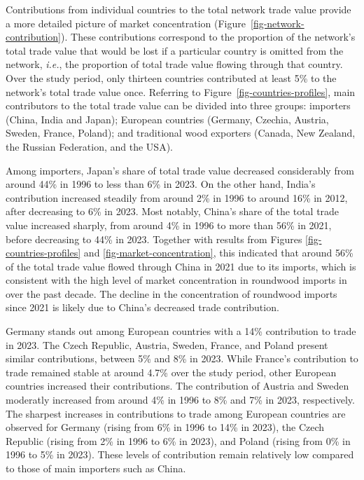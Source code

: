 \documentclass[
  authoryear,
  review,
  3p]{elsarticle}
\begin{document}
Contributions from individual countries to the total network trade value
provide a more detailed picture of market concentration
(Figure~\ref{fig-network-contribution}). These contributions correspond
to the proportion of the network's total trade value that would be lost
if a particular country is omitted from the network, \emph{i.e.}, the
proportion of total trade value flowing through that country. Over the
study period, only thirteen countries contributed at least 5\% to the
network's total trade value once. Referring to
Figure~\ref{fig-countries-profiles}, main contributors to the total
trade value can be divided into three groups: importers (China, India
and Japan); European countries (Germany, Czechia, Austria, Sweden,
France, Poland); and traditional wood exporters (Canada, New Zealand,
the Russian Federation, and the USA).

Among importers, Japan's share of total trade value decreased
considerably from around 44\% in 1996 to less than 6\% in 2023. On the
other hand, India's contribution increased steadily from around 2\% in
1996 to around 16\% in 2012, after decreasing to 6\% in 2023. Most
notably, China's share of the total trade value increased sharply, from
around 4\% in 1996 to more than 56\% in 2021, before decreasing to 44\%
in 2023. Together with results from Figures \ref{fig-countries-profiles}
and \ref{fig-market-concentration}, this indicated that around 56\% of
the total trade value flowed through China in 2021 due to its imports,
which is consistent with the high level of market concentration in
roundwood imports in over the past decade. The decline in the
concentration of roundwood imports since 2021 is likely due to China's
decreased trade contribution.

Germany stands out among European countries with a 14\% contribution to
trade in 2023. The Czech Republic, Austria, Sweden, France, and Poland
present similar contributions, between 5\% and 8\% in 2023. While
France's contribution to trade remained stable at around 4.7\% over the
study period, other European countries increased their contributions.
The contribution of Austria and Sweden moderatly increased from around
4\% in 1996 to 8\% and 7\% in 2023, respectively. The sharpest increases
in contributions to trade among European countries are observed for
Germany (rising from 6\% in 1996 to 14\% in 2023), the Czech Republic
(rising from 2\% in 1996 to 6\% in 2023), and Poland (rising from 0\% in
1996 to 5\% in 2023). These levels of contribution remain relatively low
compared to those of main importers such as China.
\end{document}
